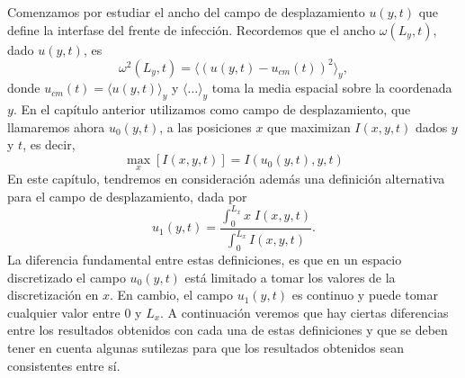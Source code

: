 

Comenzamos por estudiar el ancho del campo de desplazamiento $u(y,t)$ que define la interfase del frente de infección. Recordemos que el ancho $\omega(L_y,t)$, dado $u(y,t)$, es 
\begin{equation}
    \omega^2(L_y,t) = \langle (u(y,t) - u_{cm}(t))^2 \rangle_y, 
\end{equation} 
donde $u_{cm}(t) = \langle u(y,t) \rangle_y$ y $\langle \hdots \rangle_y$ toma la media espacial sobre la coordenada $y$. En el capítulo anterior utilizamos como campo de desplazamiento, que llamaremos ahora $u_0(y,t)$, a las posiciones $x$ que maximizan $I(x,y,t)$ dados $y$ y $t$, es decir,
\begin{equation}
    \max_x[I(x, y, t)]=I(u_0(y, t), y, t)
\end{equation}
En este capítulo, tendremos en consideración además una definición alternativa para el campo de desplazamiento, dada por 
\begin{equation}
    u_1(y,t) =  \frac{\int_{0}^{L_x} x \; I(x,y,t)}{\int_{0}^{L_x} I(x,y,t)}. 
\end{equation}
La diferencia fundamental entre estas definiciones, es que en un espacio discretizado el campo $u_0(y,t)$ está limitado a tomar los valores de la discretización en $x$. En cambio, el campo $u_1(y,t)$ es continuo y puede tomar cualquier valor entre $0$ y $L_x$. A continuación veremos que hay ciertas diferencias entre los resultados obtenidos con cada una de estas definiciones y que se deben tener en cuenta algunas sutilezas para que los resultados obtenidos sean consistentes entre sí.

